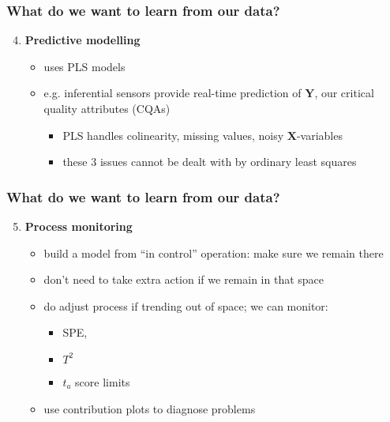 \begin{frame}\frametitle{What do we want to learn from our data?}

\begin{enumerate}
	\setcounter{enumi}{3}
	
	\item {\bf \color{myGreen}Predictive modelling} 
	
	\begin{itemize}
		\item 	uses PLS models
		
		\item 	e.g. inferential sensors provide real-time prediction of \( \mathbf{Y} \), our critical quality attributes (CQAs)
		\begin{itemize}
			\item 	PLS handles colinearity, missing values, noisy \( \mathbf{X} \)-variables
			\item 	these 3 issues cannot be dealt with by ordinary least squares
		\end{itemize}
	\end{itemize}	
\end{enumerate}
\end{frame}

\begin{frame}\frametitle{What do we want to learn from our data?}

\begin{enumerate}
	\setcounter{enumi}{4}
	\item {\bf \color{myGreen}Process monitoring} 
	
	\begin{itemize}
		
		\item 	build a model from ``in control'' operation: make sure we remain there
		
		\item 	don't need to take extra action if we remain in that space
		
		\item 	do adjust process if trending out of space; we can monitor: 
		
		\begin{itemize}
			\item 	SPE, 
			
			\item	\( T^2 \)
			
			\item	\( t_a \) score limits 
			
		\end{itemize}
		
		\item 	use contribution plots to diagnose problems
	\end{itemize}	
\end{enumerate}
\end{frame}

